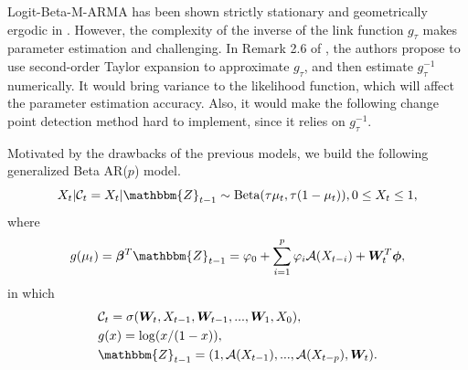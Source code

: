 \documentclass{article}
\theoremstyle{definition}
\begin{document}
Logit-Beta-M-ARMA has been shown strictly stationary and geometrically ergodic in \cite{zheng2015generalized}. However, the complexity of the inverse of the link function $g_{\tau}$ makes parameter estimation and challenging. In Remark 2.6 of \cite{zheng2015generalized}, the authors propose to use second-order Taylor expansion to approximate $g_{\tau}$, and then estimate $g_{\tau}^{-1}$ numerically. It would bring variance to the likelihood function, which will affect the parameter estimation accuracy. Also, it would make the following change point detection method hard to implement, since it relies on $g_{\tau}^{-1}.$ 

Motivated by the drawbacks of the previous models, we build the following generalized Beta AR($p$) model. 
\begin{equation}
\label{equation: model definition}
    X_t| \mathcal{C}_t = X_t|\mathbbm{Z}_{t-1}\sim \text{Beta}(\tau \mu_t, \tau(1-\mu_t)),0
    \leq X_t \leq 1,
\end{equation}
where
\begin{equation}
\label{eq: link function of GBETAAR}
g(\mu_t) =  \bm{\beta}^T \mathbbm{Z}_{t-1} = \varphi_0+ \sum_{i=1}^p \varphi_i \mathcal{A}(X_{t-i})+\bm{W}_{t}^T \bm{\phi},
\end{equation}
in which 
\begin{equation}
\label{eq: notations in the definition of generalized beta}
    \begin{aligned}
    & \mathcal{C}_{t} = \sigma(\bm{W}_t,X_{t-1},\bm{W}_{t-1},...,\bm{W}_1,X_0),\\
    & g(x) =\log(x/(1-x)),\\
    & \mathbbm{Z}_{t-1} = (1, \mathcal{A}(X_{t-1}),...,\mathcal{A}(X_{t-p}),\bm{W}_{t}).
    \end{aligned}
\end{equation}
\end{document}
